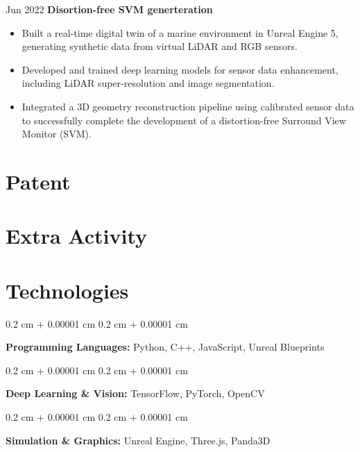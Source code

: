 \documentclass[10pt, letterpaper]{article}
\newenvironment{highlights}{
    \begin{itemize}[
        topsep=0.10 cm,
        parsep=0.10 cm,
        partopsep=0pt,
        itemsep=0pt,
        leftmargin=0.4 cm + 10pt
    ]
}{
    \end{itemize}
} %
\newenvironment{onecolentry}{
    \begin{adjustwidth}{
        0.2 cm + 0.00001 cm
    }{
        0.2 cm + 0.00001 cm
    }
}{
    \end{adjustwidth}
} %
\newenvironment{twocolentry_project}[2][]{
    \onecolentry
    \def\secondColumn{#2}
    \setcolumnwidth{\fill, 2.0 cm}
    \begin{paracol}{2}
}{
    \switchcolumn \raggedleft \secondColumn
    \end{paracol}
    \endonecolentry
} %
\begin{document}
        \begin{twocolentry_project}{
            Jun 2022
        }
            \textbf{Disortion-free SVM generteration }
            \begin{highlights}
                \item Built a real-time digital twin of a marine environment in Unreal Engine 5, generating synthetic data from virtual LiDAR and RGB sensors.

                \item Developed and trained deep learning models for sensor data enhancement, including LiDAR super-resolution and image segmentation.
                
                \item Integrated a 3D geometry reconstruction pipeline using calibrated sensor data to successfully complete the development of a distortion-free Surround View Monitor (SVM).
            \end{highlights}
        \end{twocolentry_project}


    \section{Patent}    
    



    \section{Extra Activity}    


    \section{Technologies}

        \begin{onecolentry}
            \textbf{Programming Languages:} Python, C++, JavaScript, Unreal Blueprints
        \end{onecolentry}
    
        \vspace{0.2 cm}
    
        \begin{onecolentry}
            \textbf{Deep Learning \& Vision:} TensorFlow, PyTorch, OpenCV
        \end{onecolentry}
        
        \vspace{0.2 cm}
    
        \begin{onecolentry}
            \textbf{Simulation \& Graphics:} Unreal Engine, Three.js, Panda3D
        \end{onecolentry}


        
\end{document}

